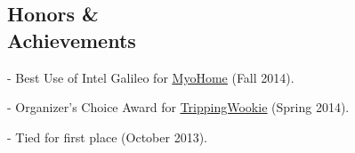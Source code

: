 \documentclass[margin]{res}
\begin{document}
\begin{minipage}{\textwidth}
\begin{resume}
 \section{Honors \& \\ Achievements} 
\begin{description} \itemsep -11pt
		\item[YHack] - Best Use of Intel Galileo for \uline{\href{http://GitHub.com/VoidingWarranties/Myo-Home}{MyoHome}} (Fall 2014). \\
		\item[HackRU] - Organizer's Choice Award for \uline{\href{http://GitHub.com/VoidingWarranties/TrippingWookie}{TrippingWookie}} (Spring 2014). \\
		\item[Microsoft Coding Competition] - Tied for first place (October 2013). \\
		\item[Rensselaer Leadership Award]
\end{description}

\end{resume} 
\end{minipage}
\end{document}
